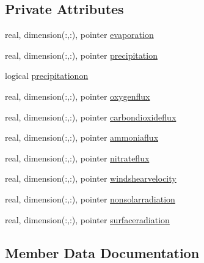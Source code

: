 \subsection*{Private Attributes}
\begin{DoxyCompactItemize}
\item 
real, dimension(\+:,\+:), pointer \mbox{\hyperlink{structmodulewaterproperties_1_1t__extsurface_a1f727273f4aad048710a47e9fd6f91c4}{evaporation}}
\item 
real, dimension(\+:,\+:), pointer \mbox{\hyperlink{structmodulewaterproperties_1_1t__extsurface_a4cecb74c7e9fe48589041a7817488efa}{precipitation}}
\item 
logical \mbox{\hyperlink{structmodulewaterproperties_1_1t__extsurface_ab4d0587d3109bc1691e4ac4dcceb1226}{precipitationon}}
\item 
real, dimension(\+:,\+:), pointer \mbox{\hyperlink{structmodulewaterproperties_1_1t__extsurface_a8506c6c21d893e94432c24ba6b17c383}{oxygenflux}}
\item 
real, dimension(\+:,\+:), pointer \mbox{\hyperlink{structmodulewaterproperties_1_1t__extsurface_abb3b96a81ff906087b805bfb856ba068}{carbondioxideflux}}
\item 
real, dimension(\+:,\+:), pointer \mbox{\hyperlink{structmodulewaterproperties_1_1t__extsurface_ac6cb5261eeacb017c8d74fd1ebca4fd9}{ammoniaflux}}
\item 
real, dimension(\+:,\+:), pointer \mbox{\hyperlink{structmodulewaterproperties_1_1t__extsurface_a574c16ba302a7776b220442a95da934d}{nitrateflux}}
\item 
real, dimension(\+:,\+:), pointer \mbox{\hyperlink{structmodulewaterproperties_1_1t__extsurface_a43d470b3c9d7b50e58aac8f8ee5af5ff}{windshearvelocity}}
\item 
real, dimension(\+:,\+:), pointer \mbox{\hyperlink{structmodulewaterproperties_1_1t__extsurface_a0cb394d95545b835ffd9b6c9ec7ab3b8}{nonsolarradiation}}
\item 
real, dimension(\+:,\+:), pointer \mbox{\hyperlink{structmodulewaterproperties_1_1t__extsurface_ac1519a350bc572b4683f99e732aa04c9}{surfaceradiation}}
\end{DoxyCompactItemize}


\subsection{Member Data Documentation}
\mbox{\label{structmodulewaterproperties_1_1t__extsurface_ac6cb5261eeacb017c8d74fd1ebca4fd9}} 
